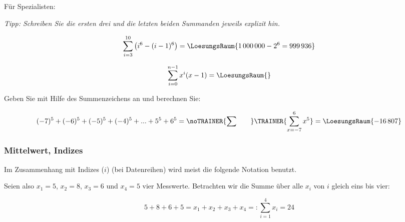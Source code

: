 Für Spezialisten:

\textit{Tipp: Schreiben Sie die ersten drei und die letzten beiden Summanden
  jeweils explizit hin.}

$$\sum_{i=3}^{10}\left(i^6 - ( i-1 )^6\right) = \LoesungsRaum{1\,000\,000 - 2^6 = 999\,936}$$
  


$$\sum_{i=0}^{n-1}x^i(x-1)=\LoesungsRaum{}$$


\newpage


Geben Sie mit Hilfe des Summenzeichens an und berechnen Sie:

$$(-7)^5 + (-6)^5 + (-5)^5 + (-4)^5 + ... + 5^5+6^5 = \noTRAINER{\sum_{}^{}\hspace{7mm}}\TRAINER{\sum_{x=-7}^{6}x^5} = \LoesungsRaum{-16\,807}$$



\newpage



\subsubsection{Mittelwert, Indizes}
Im Zusammenhang mit Indizes ($i$) (\zB bei Datenreihen) wird meist die
folgende Notation benutzt.

Seien also $x_1=5$, $x_2=8$, $x_3=6$ und $x_4=5$ vier
Messwerte. Betrachten wir die Summe über
alle $x_i$ von $i$ gleich eins bis vier:

$$5+8+6+5 = x_1 + x_2 + x_3 + x_4 =: \sum_{i=1}^4{x_i}=24$$


